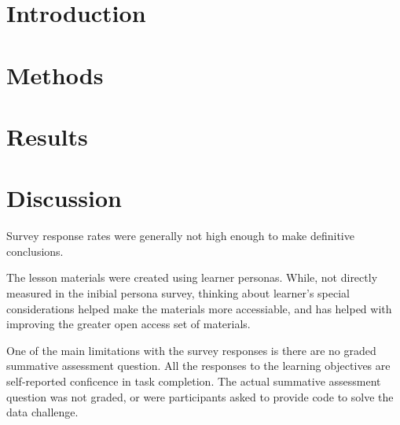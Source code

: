 \documentclass[../main.tex]{subfiles}
\begin{document}
    \section{Introduction}

    \section{Methods}

        

    \section{Results}

        

    \section{Discussion}

        Survey response rates were generally not high enough to make definitive conclusions.

        The lesson materials were created using learner personas.
        While, not directly measured in the inibial persona survey,
        thinking about learner's special considerations helped make the materials
        more accessiable,
        and has helped with improving the greater open access set of materials.

        One of the main limitations with the survey responses is there
        are no graded summative assessment question.
        All the responses to the learning objectives are self-reported conficence in task completion.
        The actual summative assessment question was not graded,
        or were participants asked to provide code to solve the data challenge.
\end{document}
